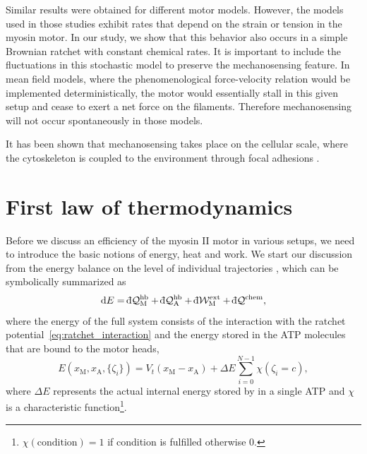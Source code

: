 \documentclass[aps,pre,twocolumn,showpacs,showkeys,superscriptaddress,floatfix]{revtex4-1}
\newcommand{\rmd}{{\mathrm d}}
\newcommand{\dbar}{{\mathchar '26 \mkern-11mu {\mathrm d}}}
\begin{document}
Similar results were obtained for different motor models\cite{stam2015isoforms,albert2014stochastic}. 
However, the models used in those studies exhibit rates that depend on the strain or tension in the myosin motor. 
In our study, we show that this behavior also occurs in a simple Brownian ratchet with constant chemical rates.
It is important to include the fluctuations in this stochastic model to preserve the mechanosensing feature.
In mean field models, where the phenomenological force-velocity relation would be implemented deterministically, 
the motor would essentially stall in this given setup and cease to exert a net force on the filaments. 
Therefore mechanosensing will not occur spontaneously in those models.

It has been shown that mechanosensing takes place on the cellular scale, 
where the cytoskeleton is coupled to the environment through focal adhesions \cite{geiger2009environmental}.

\section{First law of thermodynamics}
\label{sec:energie}
Before we discuss an efficiency of the myosin II motor in various setups,
we need to introduce the basic notions of energy, heat and work. 
We start our discussion from the energy balance on the level of individual trajectories \cite{Pesek2013},
which can be symbolically summarized as 
\begin{equation}
\rmd E = \dbar {\mathcal Q}_\text{M}^\text{hb} + \dbar {\mathcal Q}_\text{A}^\text{hb} + \dbar {\mathcal W}^\text{ext}_\text{M} + \dbar {\mathcal Q}^\text{chem}, 
\label{eq:energy_balance}
\end{equation}
where the energy of the full system consists of the interaction with the ratchet potential~\eqref{eq:ratchet_interaction}
and the energy stored in the ATP molecules that are bound to the motor heads,
\begin{equation}
E( x_\text{M}, x_\text{A}, \{ \zeta_i \}) = V_t( x_\text{M} - x_\text{A} ) + \Delta E \sum\limits_{i=0}^{N-1} \chi( \zeta_i = c ) ,
\label{eq:internal_energy}
\end{equation}
where $\Delta E$ represents the actual internal energy stored by in a single ATP and $\chi$ is a characteristic function\footnote{
$\chi(\text{condition}) = 1$ if condition is fulfilled otherwise $0$.
}.
\end{document}
